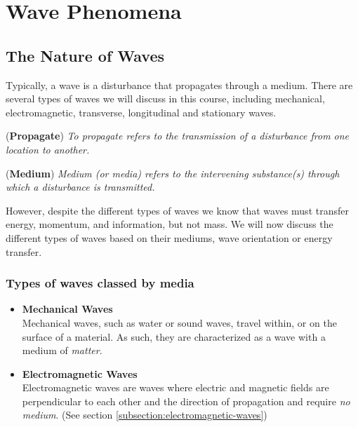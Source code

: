 \section{Wave Phenomena}

\subsection{The Nature of Waves}
\label{subsection:nature-of-waves}
Typically, a wave is a disturbance that propagates through a medium. There are several types of waves we will discuss in this course, including mechanical, electromagnetic, transverse, longitudinal and stationary waves.


\begin{definition}{(\textbf{Propagate})}
\textit{To propagate refers to the transmission of a disturbance from one location to another.}
\end{definition}
\begin{definition}{(\textbf{Medium})}
\textit{Medium (or media) refers to the intervening substance(s) through which a disturbance is transmitted.}
\end{definition}

However, despite the different types of waves we know that waves must transfer energy, momentum, and information, but not mass. 
We will now discuss the different types of waves based on their mediums, wave orientation or energy transfer.

\subsubsection{Types of waves classed by media}
\begin{itemize}
    \item \textbf{Mechanical Waves} \\
    Mechanical waves, such as water or sound waves, travel within, or on the surface of a material. As such, they are characterized as a wave with a medium of \textit{matter}.
    \item \textbf{Electromagnetic Waves}\\
    Electromagnetic waves are waves where electric and magnetic fields are perpendicular to each other and the direction of propagation and require \textit{no medium}. (See section \ref{subsection:electromagnetic-waves})
\end{itemize}
